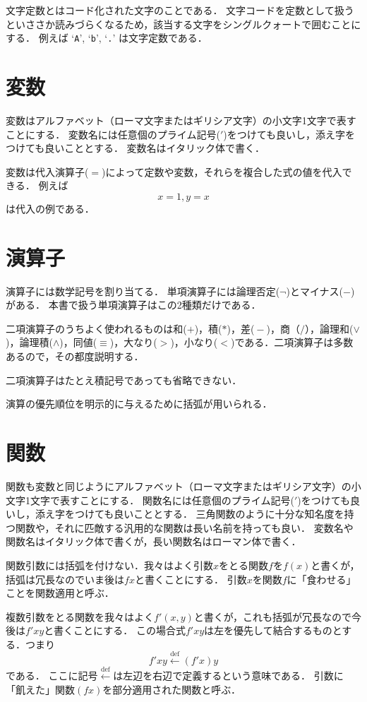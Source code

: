 \documentclass[twocolumn]{jsbook}
\newcommand{\charlit}[1]{\texttt{#1}}
\newcommand{\defeq}{\xleftarrow{\text{def}}}
\begin{document}
文字定数とはコード化された文字のことである．
文字コードを定数として扱うといささか読みづらくなるため，該当する文字をシングルクォートで囲むことにする．
例えば `\charlit{A}', `\charlit{b}', `\charlit{.}' は文字定数である．

\section{変数}

変数はアルファベット（ローマ文字またはギリシア文字）の小文字1文字で表すことにする．
変数名には任意個のプライム記号($'$)をつけても良いし，添え字をつけても良いこととする．
変数名はイタリック体で書く．

変数は代入演算子($=$)によって定数や変数，それらを複合した式の値を代入できる．
例えば $$x=1, y=x$$ は代入の例である．

\section{演算子}

演算子には数学記号を割り当てる．
単項演算子には論理否定($\neg$)とマイナス($-$)がある．
本書で扱う単項演算子はこの2種類だけである．

二項演算子のうちよく使われるものは和($+$)，積($\ast$)，差(${}-{}$)，商（${}/{}$），論理和($\vee$)，論理積($\wedge$)，同値($\equiv$)，大なり($>$)，小なり($<$)である．二項演算子は多数あるので，その都度説明する．

二項演算子はたとえ積記号であっても省略できない．

演算の優先順位を明示的に与えるために括弧が用いられる．

\section{関数}

関数も変数と同じようにアルファベット（ローマ文字またはギリシア文字）の小文字1文字で表すことにする．
関数名には任意個のプライム記号($'$)をつけても良いし，添え字をつけても良いこととする．
三角関数のように十分な知名度を持つ関数や，それに匹敵する汎用的な関数は長い名前を持っても良い．
変数名や関数名はイタリック体で書くが，長い関数名はローマン体で書く．

関数引数には括弧を付けない．我々はよく引数$x$をとる関数$f$を$f(x)$と書くが，括弧は冗長なのでいま後は$fx$と書くことにする．
引数$x$を関数$f$に「食わせる」ことを関数適用と呼ぶ．

複数引数をとる関数を我々はよく$f'(x,y)$と書くが，これも括弧が冗長なので今後は$f'xy$と書くことにする．
この場合式$f'xy$は左を優先して結合するものとする．つまり$$f'xy\defeq (f'x)y$$である．
ここに記号$\defeq$は左辺を右辺で定義するという意味である．
引数に「飢えた」関数$(fx)$を部分適用された関数と呼ぶ．
\end{document}
